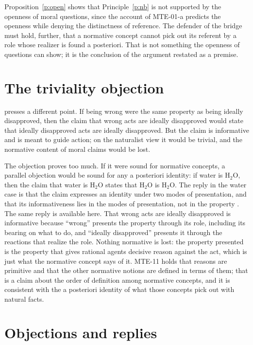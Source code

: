 \documentclass{situationist-preprint}
\begin{document}
Proposition~\ref{p:open} shows that Principle~\ref{p:nb} is not supported by the openness of moral questions, since the account of MTE-01-a predicts the openness while denying the distinctness of reference. The defender of the bridge must hold, further, that a normative concept cannot pick out its referent by a role whose realizer is found a posteriori. That is not something the openness of questions can show; it is the conclusion of the argument restated as a premise.

\section{The triviality objection}\label{s:triv}

\citet[vol.~2]{Parfit2011} presses a different point. If being wrong were the same property as being ideally disapproved, then the claim that wrong acts are ideally disapproved would state that ideally disapproved acts are ideally disapproved. But the claim is informative and is meant to guide action; on the naturalist view it would be trivial, and the normative content of moral claims would be lost.

The objection proves too much. If it were sound for normative concepts, a parallel objection would be sound for any a posteriori identity: if water is H$_2$O, then the claim that water is H$_2$O states that H$_2$O is H$_2$O. The reply in the water case is that the claim expresses an identity under two modes of presentation, and that its informativeness lies in the modes of presentation, not in the property \citep{Kripke1980}. The same reply is available here. That wrong acts are ideally disapproved is informative because \enquote{wrong} presents the property through its role, including its bearing on what to do, and \enquote{ideally disapproved} presents it through the reactions that realize the role. Nothing normative is lost: the property presented is the property that gives rational agents decisive reason against the act, which is just what the normative concept says of it. MTE-11 holds that reasons are primitive and that the other normative notions are defined in terms of them; that is a claim about the order of definition among normative concepts, and it is consistent with the a posteriori identity of what those concepts pick out with natural facts.

\section{Objections and replies}\label{s:obj}
\end{document}
